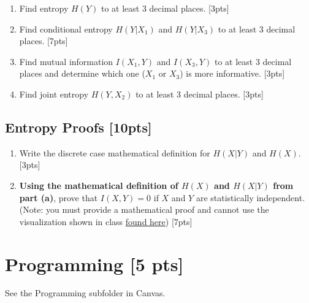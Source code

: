 \documentclass{article}
\begin{document}
\begin{enumerate}[label=(\alph*)]
    \item Find entropy $H(Y)$ to at least 3 decimal places. [3pts]
    \item Find conditional entropy $H(Y|X_1)$ and $H(Y|X_3)$ to at least 3 decimal places. [7pts]
    \item Find mutual information $I(X_1, Y)$ and $I(X_3, Y)$ to at least 3 decimal places and determine which one ($X_1$ or $X_3$) is more informative. [3pts]
    \item Find joint entropy $H(Y, X_2)$ to at least 3 decimal places. [3pts]
\end{enumerate}





\newpage


\subsection{Entropy Proofs [10pts]}

\begin{enumerate}[label=(\alph*)]
    \item Write the discrete case mathematical definition for $H(X|Y)$ and $H(X)$. [3pts]
    \item \textbf{Using the mathematical definition of $H(X)$ and $H(X|Y)$ from part (a)}, prove that $I(X,Y) = 0$ if $X$ and $Y$ are statistically independent. (Note: you must provide a mathematical proof and cannot use the visualization shown in class \href{https://mahdi-roozbahani.github.io/CS46417641-summer2022/other/CEandMI_Illustration.jpg}{found here}) [7pts] \\
    \newline
\end{enumerate}




\newpage

\section{Programming [5 pts]}
See the Programming subfolder in Canvas.
\newpage
\end{document}
